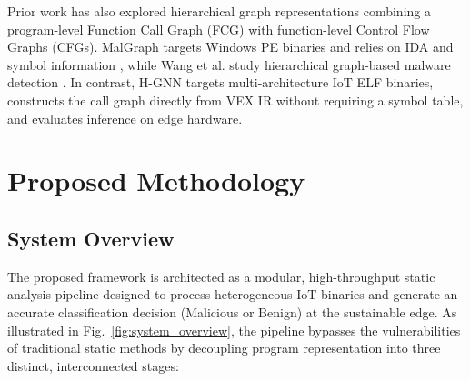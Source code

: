 \documentclass[conference]{IEEEtran}
\begin{document}
Prior work has also explored hierarchical graph representations
combining a program-level Function Call Graph (FCG) with function-level
Control Flow Graphs (CFGs). MalGraph targets Windows PE binaries and relies
on IDA and symbol information \cite{malgraph2022}, while Wang et al. study
hierarchical graph-based malware detection \cite{wang2021hier}. In contrast,
H-GNN targets multi-architecture IoT ELF binaries, constructs the call graph
directly from VEX IR without requiring a symbol table, and evaluates inference
on edge hardware.


\section{Proposed Methodology}
\label{sec:methodology}

\subsection{System Overview}
The proposed  framework is architected as a modular, high-throughput static analysis pipeline designed to process heterogeneous IoT binaries and generate an accurate classification decision (Malicious or Benign) at the sustainable edge. As illustrated in Fig.~\ref{fig:system_overview}, the pipeline bypasses the vulnerabilities of traditional static methods by decoupling program representation into three distinct, interconnected stages:
\end{document}
